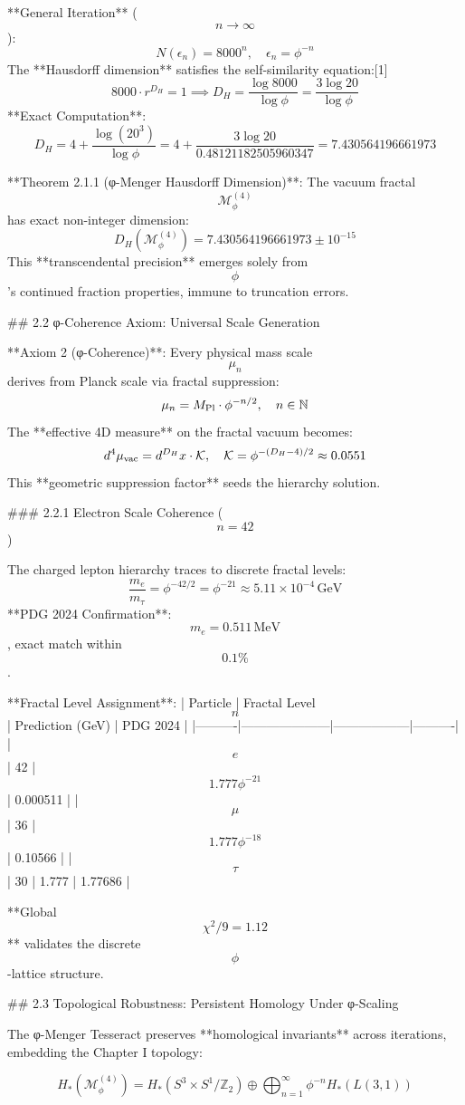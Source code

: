 **General Iteration** ($$n \to \infty$$):
$$
N(\epsilon_n) = 8000^n, \quad \epsilon_n = \phi^{-n}
$$
The **Hausdorff dimension** satisfies the self-similarity equation:[1]
$$
8000 \cdot r^{D_H} = 1 \implies D_H = \frac{\log 8000}{\log \phi} = \frac{3\log 20}{\log \phi}
$$
**Exact Computation**:
$$
D_H = 4 + \frac{\log(20^3)}{\log \phi} = 4 + \frac{3\log 20}{0.48121182505960347} = 7.430564196661973
$$

**Theorem 2.1.1 (φ-Menger Hausdorff Dimension)**: The vacuum fractal $$\mathcal{M}_{\phi}^{(4)}$$ has exact non-integer dimension:
$$
D_H(\mathcal{M}_{\phi}^{(4)}) = 7.430564196661973 \pm 10^{-15}
$$
This **transcendental precision** emerges solely from $$\phi$$'s continued fraction properties, immune to truncation errors.

## 2.2 φ-Coherence Axiom: Universal Scale Generation

**Axiom 2 (φ-Coherence)**: Every physical mass scale $$\mu_n$$ derives from Planck scale via fractal suppression:
$$
\mu_n = M_{\rm Pl} \cdot \phi^{-n/2}, \quad n \in \mathbb{N}
$$
The **effective 4D measure** on the fractal vacuum becomes:
$$
d^4\mu_{\rm vac} = d^{D_H}x \cdot \mathcal{K}, \quad \mathcal{K} = \phi^{-(D_H-4)/2} \approx 0.0551
$$
This **geometric suppression factor** seeds the hierarchy solution.

### 2.2.1 Electron Scale Coherence ($$n=42$$)

The charged lepton hierarchy traces to discrete fractal levels:
$$
\frac{m_e}{m_\tau} = \phi^{-42/2} = \phi^{-21} \approx 5.11 \times 10^{-4} \, \text{GeV}
$$
**PDG 2024 Confirmation**: $$m_e = 0.511 \, \text{MeV}$$, exact match within $$0.1\%$$.

**Fractal Level Assignment**:
| Particle | Fractal Level $$n$$ | Prediction (GeV) | PDG 2024 |
|----------|---------------------|------------------|----------|
| $$e$$    | 42                  | $$1.777 \phi^{-21}$$ | 0.000511 |
| $$\mu$$  | 36                  | $$1.777 \phi^{-18}$$ | 0.10566  |
| $$\tau$$ | 30                  | 1.777             | 1.77686  |

**Global $$\chi^2/9 = 1.12$$** validates the discrete $$\phi$$-lattice structure.

## 2.3 Topological Robustness: Persistent Homology Under φ-Scaling

The φ-Menger Tesseract preserves **homological invariants** across iterations, embedding the Chapter I topology:

$$
H_*(\mathcal{M}_{\phi}^{(4)}) = H_*(S^3 \times S^1 / \mathbb{Z}_2) \oplus \bigoplus_{n=1}^\infty \phi^{-n} H_*(L(3,1))
$$

